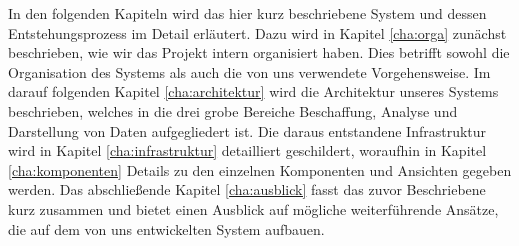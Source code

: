 In den folgenden Kapiteln wird das hier kurz beschriebene System und dessen Entstehungsprozess im Detail erläutert. Dazu wird in Kapitel \ref{cha:orga} zunächst beschrieben, wie wir das Projekt intern organisiert haben. Dies betrifft sowohl die Organisation des Systems als auch die von uns verwendete Vorgehensweise. Im darauf folgenden Kapitel \ref{cha:architektur} wird die Architektur unseres Systems beschrieben, welches in die drei grobe Bereiche Beschaffung, Analyse und Darstellung von Daten aufgegliedert ist. Die daraus entstandene Infrastruktur wird in Kapitel \ref{cha:infrastruktur} detailliert geschildert, woraufhin in Kapitel \ref{cha:komponenten} Details zu den einzelnen Komponenten und Ansichten gegeben werden. Das abschließende Kapitel \ref{cha:ausblick} fasst das zuvor Beschriebene kurz zusammen und bietet einen Ausblick auf mögliche weiterführende Ansätze, die auf dem von uns entwickelten System aufbauen.
